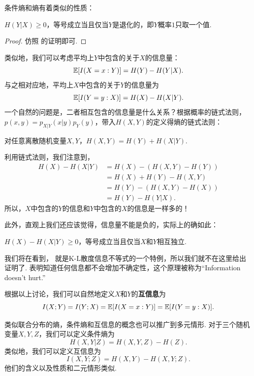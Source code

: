 条件熵和熵有着类似的性质：
\begin{proposition}\label{prop:conditional-entropy-nonnegative}
    $H(Y|X)\geq 0$，等号成立当且仅当$Y$是退化的，即$Y$概率$1$只取一个值.
\end{proposition}
\begin{proof}
    仿照 的证明即可.
\end{proof}
类似地，我们可以考虑平均上$Y$中包含的关于$X$的信息量：
\[\mathbb{E}[I(X=x:Y)]=H(Y)-H(Y|X).\]
与之相对应地，平均上$X$中包含的关于$Y$的信息量为
\[\mathbb{E}[I(Y=y:X)]=H(X)-H(X|Y).\]
一个自然的问题是，二者相互包含的信息量是什么关系？根据概率的链式法则，$p(x,y)=p_{X|Y}(x|y)p_Y(y)$，带入$H(X,Y)$的定义得熵的链式法则：

\begin{proposition}\label{prop:entropy-chain-rule}
    对任意离散随机变量$X,Y$，$H(X,Y)=H(Y)+H(X|Y)$.    
\end{proposition}

利用链式法则，我们注意到，
\begin{align*}
    H(X)-H(X|Y)&=H(X)-(H(X,Y)-H(Y))\\
               &=H(X)+H(Y)-H(X,Y)\\
               &=H(Y)-(H(X,Y)-H(X))\\
               &=H(Y)-H(Y|X).
\end{align*}
所以，$X$中包含的$Y$的信息和$Y$中包含的$X$的信息是一样多的！

此外，直观上我们还应该觉得，信息量不能是负的，实际上的确如此：
\begin{proposition}\label{prop:information-doesnt-hurt}
    $H(X)-H(X|Y)\geq 0$，等号成立当且仅当$X$和$Y$相互独立.
\end{proposition}

我们将在看到， 就是K-L散度信息不等式的一个特例，所以我们就不在这里给出证明了.  表明知道任何信息都不会增加不确定性，这个原理被称为“Information doesn't hurt.”

根据以上讨论，我们可以自然地定义$X$和$Y$的\textbf{互信息}为
\[I(X;Y)=I(Y;X)=\mathbb{E}[I(X=x:Y)]=\mathbb{E}[I(Y=y:X)].\]

类似联合分布的熵，条件熵和互信息的概念也可以推广到多元情形. 对于三个随机变量$X,Y,Z$，我们可以定义条件熵为
\[H(X,Y|Z)=H(X,Y,Z)-H(Z).\]
类似地，我们可以定义互信息为
\[I(X,Y;Z)=H(X,Y)-H(X,Y;Z).\]
他们的含义以及性质和二元情形类似.

